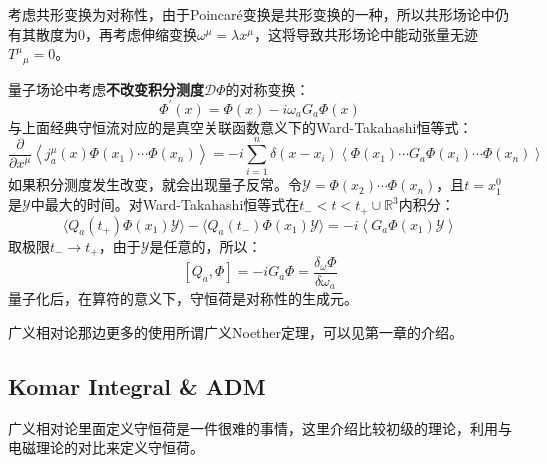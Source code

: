 考虑共形变换为对称性，由于Poincar\'e变换是共形变换的一种，所以共形场论中仍有其散度为0，再考虑伸缩变换$\omega^\mu=\lambda x^\mu$，这将导致共形场论中能动张量无迹${T^\mu}_{\mu}=0$。

量子场论中考虑\textbf{不改变积分测度$\mathcal{D}\Phi$}的对称变换：
\begin{equation}
	\Phi^{\prime}(x)=\Phi(x)-i\omega_aG_a\Phi(x)
\end{equation}
与上面经典守恒流对应的是真空关联函数意义下的Ward-Takahashi恒等式：
\begin{equation}
	\boxed{
		\frac\partial{\partial x^\mu}\left\langle j_a^\mu(x)\Phi(x_1)\cdots\Phi(x_n)\right\rangle   
		=-i\sum_{i=1}^n\delta(x-x_i)\left<\Phi(x_1)\cdots G_a\Phi(x_i)\cdots\Phi(x_n)\right>
	}
\end{equation}
如果积分测度发生改变，就会出现量子反常\cite{Bilal:2008qx}。令$\mathcal{Y}=\Phi(x_2)\cdots\Phi(x_n)$，且$t=x_1^0$是$\mathcal{Y}$中最大的时间。对Ward-Takahashi恒等式在${t_-<t<t_+}\cup \mathbb{R}^3$内积分：
\begin{equation}
	\langle Q_a(t_+)\Phi(x_1)\mathcal{Y}\rangle-\langle Q_a(t_-)\Phi(x_1)\mathcal{Y}\rangle=-i\left\langle G_a\Phi(x_1)\mathcal{Y}\right\rangle
\end{equation}
取极限$t_-\to t_+$，由于$\mathcal{Y}$是任意的，所以：
\begin{equation}
	\boxed{
	[Q_a,\Phi]=-iG_a\Phi =\frac{\delta_\omega \Phi}{\delta \omega_a}}
\end{equation}
量子化后，在算符的意义下，守恒荷是对称性的生成元。

广义相对论那边更多的使用所谓广义Noether定理，可以见\cite{Compere:2019qed}第一章的介绍。
\subsection{Komar Integral \& ADM}
广义相对论里面定义守恒荷是一件很难的事情，这里介绍比较初级的理论，利用与电磁理论的对比来定义守恒荷。


